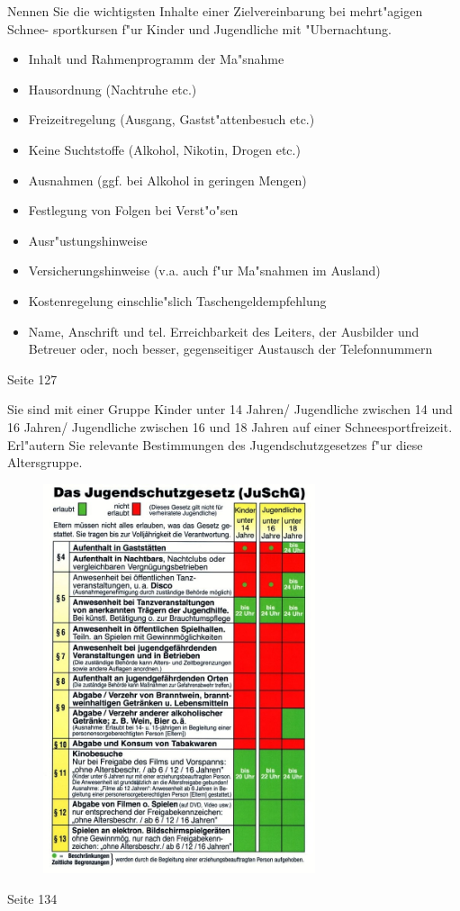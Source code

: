 \begin{question}{4}
Nennen Sie die wichtigsten Inhalte einer Zielvereinbarung bei mehrt"agigen Schnee- sportkursen f"ur Kinder und Jugendliche mit "Ubernachtung.
\end{question}
\begin{solution}
\begin{itemize}
\item Inhalt und Rahmenprogramm der Ma"snahme
\item Hausordnung (Nachtruhe etc.)
\item Freizeitregelung (Ausgang, Gastst"attenbesuch etc.)
\item Keine Suchtstoffe (Alkohol, Nikotin, Drogen etc.)
\item Ausnahmen (ggf. bei Alkohol in geringen Mengen)
\item Festlegung von Folgen bei Verst"o"sen
\item Ausr"ustungshinweise
\item Versicherungshinweise (v.a. auch f"ur Ma"snahmen im Ausland)
\item Kostenregelung einschlie"slich Taschengeldempfehlung
\item Name, Anschrift und tel. Erreichbarkeit des Leiters, der Ausbilder und Betreuer oder, noch besser, gegenseitiger Austausch der Telefonnummern
\end{itemize}
 Seite 127
\end{solution}

\begin{question}{4}
Sie sind mit einer Gruppe Kinder unter 14 Jahren/ Jugendliche zwischen 14 und 16 Jahren/ Jugendliche zwischen 16 und 18 Jahren auf einer Schneesportfreizeit. Erl"autern Sie relevante Bestimmungen des Jugendschutzgesetzes f"ur diese Altersgruppe.
\end{question}
\begin{solution}
\begin{figure}[H]
  \centering
  \includegraphics[width=8cm]{pic/js.jpg}
  \label{fig:js}
\end{figure}
 Seite 134
\end{solution}